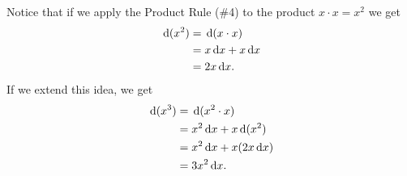 








Notice that if we apply the Product Rule (\#4) to the product $x\cdot
x = x^2$ we get
\begin{align*}
  \thinspace{\rm d}(x^2)&=\thinspace{\rm d}(x\cdot x)\\
          &=x\thinspace{\rm d}x+x\thinspace{\rm d}x\\
          &=2x\thinspace{\rm d}x.
\end{align*}
If we extend this idea, we get
\begin{align*}
  \thinspace{\rm d}(x^3)&=\thinspace{\rm d}(x^2\cdot x)\\
          &=x^2\thinspace{\rm d}x+x\thinspace{\rm d}(x^2)\\
          &=x^2\thinspace{\rm d}x+x(2x\thinspace{\rm d}x)\\
          &=3x^2\thinspace{\rm d}x.
\end{align*}

